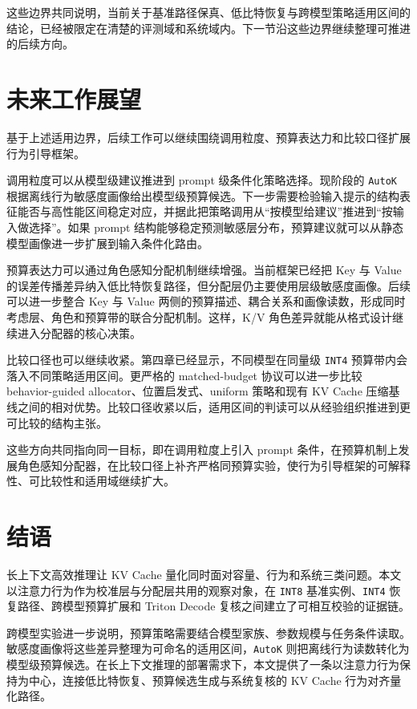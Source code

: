 这些边界共同说明，当前关于基准路径保真、低比特恢复与跨模型策略适用区间的结论，已经被限定在清楚的评测域和系统域内。下一节沿这些边界继续整理可推进的后续方向。

\section{未来工作展望}
\label{sec:conclusion-future}

基于上述适用边界，后续工作可以继续围绕调用粒度、预算表达力和比较口径扩展行为引导框架。

调用粒度可以从模型级建议推进到 prompt 级条件化策略选择。现阶段的 \texttt{AutoK} 根据离线行为敏感度画像给出模型级预算候选。下一步需要检验输入提示的结构表征能否与高性能区间稳定对应，并据此把策略调用从“按模型给建议”推进到“按输入做选择”。如果 prompt 结构能够稳定预测敏感层分布，预算建议就可以从静态模型画像进一步扩展到输入条件化路由。

预算表达力可以通过角色感知分配机制继续增强。当前框架已经把 Key 与 Value 的误差传播差异纳入低比特恢复路径，但分配层仍主要使用层级敏感度画像。后续可以进一步整合 Key 与 Value 两侧的预算描述、耦合关系和画像读数，形成同时考虑层、角色和预算带的联合分配机制。这样，K/V 角色差异就能从格式设计继续进入分配器的核心决策。

比较口径也可以继续收紧。第四章已经显示，不同模型在同量级 \texttt{INT4} 预算带内会落入不同策略适用区间。更严格的 matched-budget 协议可以进一步比较 behavior-guided allocator、位置启发式、uniform 策略和现有 KV Cache 压缩基线之间的相对优势。比较口径收紧以后，适用区间的判读可以从经验组织推进到更可比较的结构主张。

这些方向共同指向同一目标，即在调用粒度上引入 prompt 条件，在预算机制上发展角色感知分配器，在比较口径上补齐严格同预算实验，使行为引导框架的可解释性、可比较性和适用域继续扩大。

\section{结语}
\label{sec:conclusion-closing}

长上下文高效推理让 KV Cache 量化同时面对容量、行为和系统三类问题。本文以注意力行为作为校准层与分配层共用的观察对象，在 \texttt{INT8} 基准实例、\texttt{INT4} 恢复路径、跨模型预算扩展和 Triton Decode 复核之间建立了可相互校验的证据链。

跨模型实验进一步说明，预算策略需要结合模型家族、参数规模与任务条件读取。敏感度画像将这些差异整理为可命名的适用区间，\texttt{AutoK} 则把离线行为读数转化为模型级预算候选。在长上下文推理的部署需求下，本文提供了一条以注意力行为保持为中心，连接低比特恢复、预算候选生成与系统复核的 KV Cache 行为对齐量化路径。

